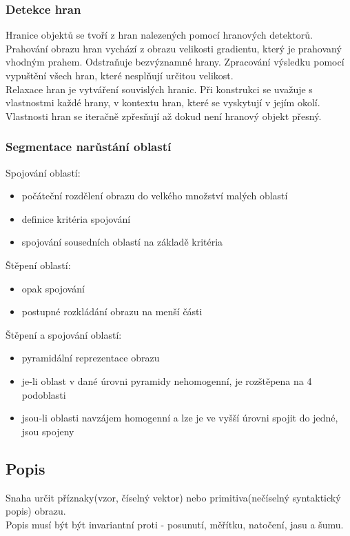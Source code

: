 \subsubsection{Detekce hran}
Hranice objektů se tvoří z hran nalezených pomocí hranových detektorů.\\
Prahování obrazu hran vychází z obrazu velikosti gradientu, který je prahovaný vhodným prahem. Odstraňuje bezvýznamné hrany. Zpracování výsledku pomocí vypuštění všech hran, které nesplňují určitou velikost.\\
Relaxace hran je vytváření souvislých hranic. Při konstrukci se uvažuje s vlastnostmi každé hrany, v kontextu hran, které se vyskytují v jejím okolí. Vlastnosti hran se iteračně zpřesňují až dokud není hranový objekt přesný.\\

\subsubsection{Segmentace narůstání oblastí}
Spojování oblastí:
\begin{itemize}
    \item počáteční rozdělení obrazu do velkého množství malých oblastí
    \item definice kritéria spojování
    \item spojování sousedních oblastí na základě kritéria
\end{itemize}
Štěpení oblastí:
\begin{itemize}
    \item opak spojování
    \item postupné rozkládání obrazu na menší části
\end{itemize}
Štěpení a spojování oblastí:
\begin{itemize}
    \item pyramidální reprezentace obrazu
    \item je-li oblast v dané úrovni pyramidy nehomogenní, je rozštěpena na 4 podoblasti
    \item jsou-li oblasti navzájem homogenní a lze je ve vyšší úrovni spojit do jedné, jsou spojeny
\end{itemize}

\subsection{Popis}
Snaha určit příznaky(vzor, číselný vektor) nebo primitiva(nečíselný syntaktický popis) obrazu.\\
Popis musí být být invariantní proti - posunutí, měřítku, natočení, jasu a šumu.\\
